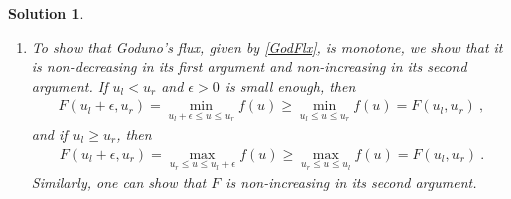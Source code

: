\documentclass[10pt,letterpaper]{article}
\newcommand{\frb}[1]{ \left(  {#1} \right) }
\theoremstyle{break}
\newtheorem{solution}{Solution}
\begin{document}
\begin{solution}
\begin{enumerate}
        \item
        To show that Goduno's flux, given by \eqref{GodFlx}, is monotone, we show that it is non-decreasing in its first argument and non-increasing in its second argument.
        If $u_l<u_r$ and $\epsilon>0$ is small enough, then
        \begin{gather}
            F\frb{u_l+\epsilon,u_r}=\min_{u_l+\epsilon\le u\le u_r} f(u) \ge \min_{u_l\le u\le u_r} f(u)
                =F(u_l,u_r)\ ,
        \end{gather}
        and if $u_l\ge u_r$, then
        \begin{gather}
            F\frb{u_l+\epsilon,u_r}=\max_{u_r\le u\le u_l+\epsilon} f(u) \ge \max_{u_r\le u\le u_l} f(u)
                =F(u_l,u_r)\ .
        \end{gather}
        Similarly, one can show that $F$ is non-increasing in its second argument.
    \end{enumerate}
\end{solution}
\end{document}
